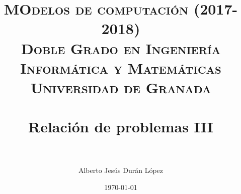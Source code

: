 


\title{	
	\normalfont \normalsize 
	\textsc{\textbf{MOdelos de computación (2017-2018)} \\ Doble Grado en Ingeniería Informática y Matemáticas \\ Universidad de Granada} \\ [25pt] 
	\horrule{0.5pt} \\[0.4cm]
	\huge Relación de problemas III \\ 
	\horrule{2pt} \\[0.5cm] 
}

\author{Alberto Jesús Durán López} 
\date{\normalsize\today} %



	\maketitle       %
	\newpage 
	\newpage
	




